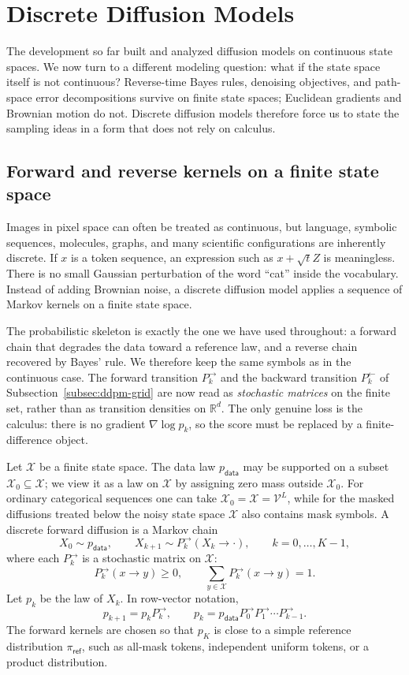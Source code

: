 \documentclass{amsart}
\numberwithin{equation}{section}
\theoremstyle{plain}
\theoremstyle{definition}
\theoremstyle{remark}
\newcommand{\R}{\mathbb{R}}
\newcommand{\cX}{\mathcal{X}}
\newcommand{\mc}[1]{\mathcal{#1}}
\newcommand{\pdata}{p_{\mathsf{data}}}
\begin{document}
\section{Discrete Diffusion Models}
\label{sec:discrete}

The development so far built and analyzed diffusion models on continuous state
spaces.  We now turn to a different modeling question: what if the state space
itself is not continuous?  Reverse-time Bayes rules, denoising objectives, and
path-space error decompositions survive on finite state spaces; Euclidean
gradients and Brownian motion do not.  Discrete diffusion models therefore force
us to state the sampling ideas in a form that does not rely on calculus.

\subsection{Forward and reverse kernels on a finite state space}

Images in pixel space can often be treated as continuous, but language,
symbolic sequences, molecules, graphs, and many scientific configurations are
inherently discrete.  If $x$ is a token sequence, an expression such as
$x+\sqrt t Z$ is meaningless.  There is no small Gaussian perturbation of the
word ``cat'' inside the vocabulary.  Instead of adding Brownian noise, a
discrete diffusion model applies a sequence of Markov kernels on a finite state
space.

The
probabilistic skeleton is exactly the one we have used throughout: a forward
chain that degrades the data toward a reference law, and a reverse chain
recovered by Bayes' rule.  We therefore keep the same symbols as in the
continuous case.  The forward transition $P_k^{\to}$ and the backward
transition $P_k^{\leftarrow}$ of Subsection~\ref{subsec:ddpm-grid} are now read
as \emph{stochastic matrices} on the finite set, rather than as transition
densities on $\R^d$.  The only genuine loss is the calculus: there
is no gradient $\nabla\log p_k$, so the score must be replaced by a
finite-difference object.

Let $\cX$ be a finite state space.  The data law $\pdata$ may be
supported on a subset $\cX_0\subseteq\cX$; we view it as a
law on $\cX$ by assigning zero mass outside $\cX_0$.  For ordinary
categorical sequences one can take $\cX_0=\cX=\mc{V}^L$, while
for the masked diffusions treated below the noisy state space $\cX$ also
contains mask symbols.  A
discrete forward diffusion is a Markov chain
\begin{equation}\label{eq:discrete-forward}
    X_0\sim \pdata,\qquad
    X_{k+1}\sim P_k^{\to}(X_k \to \cdot),
    \qquad k=0,\ldots,K-1,
\end{equation}
where each $P_k^{\to}$ is a stochastic matrix on $\cX$:
\[
    P_k^{\to}(x \to y)\geq0,\qquad
    \sum_{y\in\cX}P_k^{\to}(x \to y)=1.
\]
Let $p_k$ be the law of $X_k$.  In row-vector notation,
\[
    p_{k+1}=p_kP_k^{\to},\qquad
    p_k=\pdata P_0^{\to}P_1^{\to}\cdots P_{k-1}^{\to}.
\]
The forward kernels are chosen so that $p_K$ is close to a simple reference
distribution $\pi_{\mathsf{ref}}$, such as all-mask tokens, independent uniform
tokens, or a product distribution.
\end{document}
